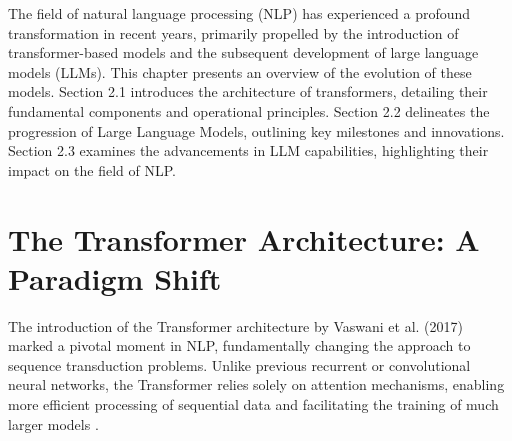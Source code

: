 \documentclass[logo,msc]{infthesis}           %
\begin{document}
The field of natural language processing (NLP) has experienced a profound transformation in recent years, primarily propelled by the introduction of transformer-based models and the subsequent development of large language models (LLMs). This chapter presents an overview of the evolution of these models. Section 2.1 introduces the architecture of transformers, detailing their fundamental components and operational principles. Section 2.2 delineates the progression of Large Language Models, outlining key milestones and innovations. Section 2.3 examines the advancements in LLM capabilities, highlighting their impact on the field of NLP.


\section{The Transformer Architecture: A Paradigm Shift}
The introduction of the Transformer architecture by Vaswani et al. (2017) marked a pivotal moment in NLP, fundamentally changing the approach to sequence transduction problems. Unlike previous recurrent or convolutional neural networks, the Transformer relies solely on attention mechanisms, enabling more efficient processing of sequential data and facilitating the training of much larger models \cite{vaswani2023attentionneed}.
\end{document}
